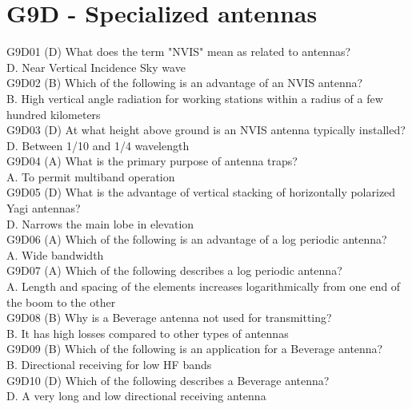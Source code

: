 \documentclass[12pt,letterpaper]{report}
\begin{document}
\section{G9D - Specialized antennas}

G9D01 (D) What does the term "NVIS" mean as related to antennas?\\
D. Near Vertical Incidence Sky wave\\

G9D02 (B) Which of the following is an advantage of an NVIS antenna?\\
B. High vertical angle radiation for working stations within a radius of a few hundred kilometers\\

G9D03 (D) At what height above ground is an NVIS antenna typically installed?\\
D. Between 1/10 and 1/4 wavelength\\

G9D04 (A) What is the primary purpose of antenna traps?\\
A. To permit multiband operation\\

G9D05 (D) What is the advantage of vertical stacking of horizontally polarized Yagi antennas?\\
D. Narrows the main lobe in elevation\\

G9D06 (A) Which of the following is an advantage of a log periodic antenna?\\
A. Wide bandwidth\\

G9D07 (A) Which of the following describes a log periodic antenna?\\
A. Length and spacing of the elements increases logarithmically from one end of the boom to the other\\

G9D08 (B) Why is a Beverage antenna not used for transmitting?\\
B. It has high losses compared to other types of antennas\\

G9D09 (B) Which of the following is an application for a Beverage antenna?\\
B. Directional receiving for low HF bands\\

G9D10 (D) Which of the following describes a Beverage antenna?\\
D. A very long and low directional receiving antenna\\
\end{document}
